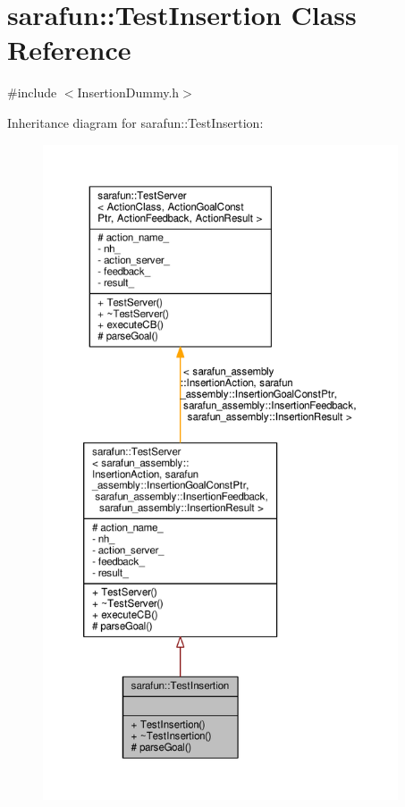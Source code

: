 \hypertarget{classsarafun_1_1TestInsertion}{\section{sarafun\-:\-:Test\-Insertion Class Reference}
\label{classsarafun_1_1TestInsertion}
}


{\ttfamily \#include $<$Insertion\-Dummy.\-h$>$}



Inheritance diagram for sarafun\-:\-:Test\-Insertion\-:
\nopagebreak
\begin{figure}[H]
\begin{center}
\leavevmode
\includegraphics[height=550pt]{d8/d44/classsarafun_1_1TestInsertion__inherit__graph}
\end{center}
\end{figure}


